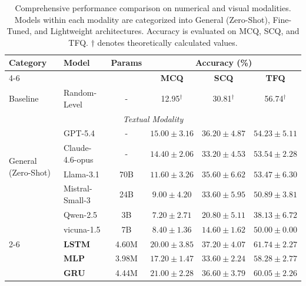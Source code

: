 \begin{table}[t]
    \centering
    \caption{Comprehensive performance comparison on numerical and visual modalities. Models within each modality are categorized into General (Zero-Shot), Fine-Tuned, and Lightweight architectures. Accuracy is evaluated on MCQ, SCQ, and TFQ. $\dagger$ denotes theoretically calculated values.}
    \label{tab:main_results_hierarchical}
    \renewcommand{\arraystretch}{1.2} %
    \setlength{\tabcolsep}{14pt} %
    \begin{tabular}{@{} l l c c c c @{}}
        \toprule
        \multirow{2}{*}{\textbf{Category}} & \multirow{2}{*}{\textbf{Model}} & \multirow{2}{*}{\textbf{Params}} & \multicolumn{3}{c}{\textbf{Accuracy (\%)}} \\
        \cmidrule(lr){4-6} 
        & & & \textbf{MCQ} & \textbf{SCQ} & \textbf{TFQ} \\
        \midrule
        
        Baseline & Random-Level & - & 12.95$^\dagger$ & 30.81$^\dagger$ & 56.74$^\dagger$ \\
        \midrule
        
        \multicolumn{6}{c}{\textit{Textual Modality}} \\
        \midrule

        \multirow{4}{*}{General (Zero-Shot)} 
         &  GPT-5.4 & - & $15.00 \pm 3.16$ & $36.20 \pm 4.87$ & $54.23 \pm 5.11$ \\
        & Claude-4.6-opus & - & $14.40 \pm 2.06$ & $33.20 \pm 4.53$ & $53.54 \pm 2.28$ \\
        & Llama-3.1  & 70B & $11.60 \pm 3.26$ & $35.60 \pm 6.62$ & $53.47 \pm 6.30$  \\
        & Mistral-Small-3 & 24B & $9.00 \pm 4.20$ & $33.60 \pm 5.95$ & $50.89 \pm 3.81$ \\
        & Qwen-2.5  & 3B & $7.20 \pm 2.71$ & $20.80 \pm 5.11$ & $38.13 \pm 6.72$ \\
        & vicuna-1.5  & 7B & $8.40 \pm 1.36$ & $14.60 \pm 1.62$ & $50.00 \pm 0.00$ \\
        \cmidrule(l){2-6} 
        
        \multirow{2}{*}{Lightweight (Ours)} 
        & \textbf{LSTM} & 4.60M &  $20.00 \pm 3.85$ & $ 37.20 \pm 4.07$ & $61.74 \pm 2.27$ \\
        & \textbf{MLP} & 3.98M & $17.20 \pm 1.47$ & $ 33.60 \pm 2.24$ & $58.28 \pm 2.77$ \\
        & \textbf{GRU} & 4.44M & $21.00 \pm 2.28$ & $ 36.60 \pm 3.79$ & $60.05 \pm 2.26$ \\
        \midrule


\end{tabular}
\end{table}
